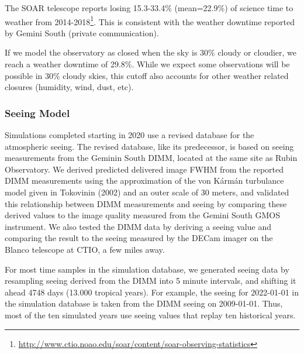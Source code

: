 The SOAR telescope reports losing 15.3-33.4\% (mean=22.9\%) of science time to weather from 2014-2018\footnote{\url{http://www.ctio.noao.edu/soar/content/soar-observing-statistics}}. This is consistent with the weather downtime reported by Gemini South (private communication). 

If we model the observatory as closed when the sky is 30\% cloudy or cloudier, we reach a weather downtime of 29.8\%. While we expect some observations will be possible in 30\% cloudy skies, this cutoff also accounts for other weather related closures (humidity, wind, dust, etc).

\subsubsection{Seeing Model}

Simulations completed starting in 2020 use a revised database for the atmospheric seeing. The revised database, like its predecessor, is based on seeing measurements from the Geminin South DIMM, located at the same site as Rubin Observatory. We derived predicted delivered image FWHM from the reported DIMM measurements using the approximation of the von K\'arm\'an turbulance model given in Tokovinin (2002) and an outer scale of 30 meters, and validated this relationship between DIMM measurements and seeing by comparing these derived values to the image quality measured from the Gemini South GMOS instrument. We also tested the DIMM data by deriving a seeing value and comparing the result to the seeing measured by the DECam imager on the Blanco telescope at CTIO, a few miles away.

For most time samples in the simulation database, we generated seeing data by resampling seeing derived from the DIMM into 5 minute intervals, and shifting it ahead 4748 days (13.000 tropical years). For example, the seeing for 2022-01-01 in the simulation database is taken from the DIMM seeing on 2009-01-01. Thus, most of the ten simulated years use seeing values that replay ten historical years.

